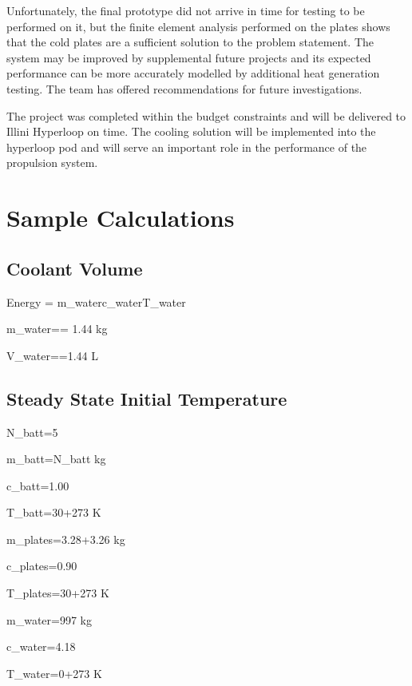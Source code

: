 \documentclass[11pt]{article}
\numberwithin{equation}{subsection} %
\begin{document}
Unfortunately, the final prototype did not arrive in time for testing to be performed on it, but the finite element analysis performed on the plates shows that the cold plates are a sufficient solution to the problem statement. The system may be improved by supplemental future projects and its expected performance can be more accurately modelled by additional heat generation testing. The team has offered recommendations for future investigations.

The project was completed within the budget constraints and will be delivered to Illini Hyperloop on time. The cooling solution will be implemented into the hyperloop pod and will serve an important role in the performance of the propulsion system.
\section{Sample Calculations}

\subsection{Coolant Volume}\label{coolant_vol}

Energy = m_{water}\cdot c_{water}\cdot \Delta T_{water}\

m_{water}== 1.44 kg

V_{water}==1.44 L




\subsection{Steady State Initial Temperature}\label{initial_tem}

N_{batt}=5 %

m_{batt}=N_{batt} kg  %

c_{batt}=1.00 

T_{batt}=30+273 K %

m_{plates}=3.28+3.26 kg

c_{plates}=0.90 

T_{plates}=30+273 K

m_{water}=997 kg

c_{water}=4.18 

T_{water}=0+273 K %
\end{document}
